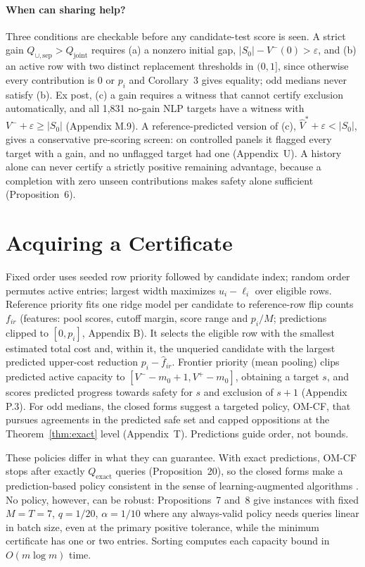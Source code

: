 \documentclass[11pt]{article}
\newcommand{\Qj}{Q_{\mathrm{joint}}}
\newcommand{\Qu}{Q_{\cup,\mathrm{sep}}}
\newcommand{\Qx}{Q_{\mathrm{exact}}}
\newcommand{\Sz}{S_0}
\begin{document}
\paragraph{When can sharing help?} Three conditions are checkable before any candidate-test score is seen. A strict gain $\Qu>\Qj$ requires (a) a nonzero initial gap, $|\Sz|-V^-(0)>\varepsilon$, and (b) an active row with two distinct replacement thresholds in $(0,1]$, since otherwise every contribution is $0$ or $p_i$ and Corollary~3 gives equality; odd medians never satisfy (b). Ex post, (c) a gain requires a witness that cannot certify exclusion automatically, and all 1,831 no-gain NLP targets have a witness with $V^-+\varepsilon\ge|\Sz|$ (Appendix M.9). A reference-predicted version of (c), $\hat V^*+\varepsilon<|\Sz|$, gives a conservative pre-scoring screen: on controlled panels it flagged every target with a gain, and no unflagged target had one (Appendix~U). A history alone can never certify a strictly positive remaining advantage, because a completion with zero unseen contributions makes safety alone sufficient (Proposition~6).

\section{Acquiring a Certificate}
\label{sec:acquire}
Fixed order uses seeded row priority followed by candidate index; random order permutes active entries; largest width maximizes $u_i-\ell_i$ over eligible rows. Reference priority fits one ridge model per candidate to reference-row flip counts $f_{ir}$ (features: pool scores, cutoff margin, score range and $p_i/M$; predictions clipped to $[0,p_i]$, Appendix B). It selects the eligible row with the smallest estimated total cost and, within it, the unqueried candidate with the largest predicted upper-cost reduction $p_i-\hat f_{ir}$. Frontier priority (mean pooling) clips predicted active capacity to $[V^--m_0+1,V^+-m_0]$, obtaining a target $s$, and scores predicted progress towards safety for $s$ and exclusion of $s+1$ (Appendix P.3). For odd medians, the closed forms suggest a targeted policy, OM-CF, that pursues agreements in the predicted safe set and capped oppositions at the Theorem~\ref{thm:exact} level (Appendix~T). Predictions guide order, not bounds.

These policies differ in what they can guarantee. With exact predictions, OM-CF stops after exactly $\Qx$ queries (Proposition~20), so the closed forms make a prediction-based policy consistent in the sense of learning-augmented algorithms \citep{lykouris2018caching,purohit2018predictions}. No policy, however, can be robust: Propositions~7 and~8 give instances with fixed $M=T=7$, $q=1/20$, $\alpha=1/10$ where any always-valid policy needs queries linear in batch size, even at the primary positive tolerance, while the minimum certificate has one or two entries. Sorting computes each capacity bound in $O(m\log m)$ time.
\end{document}

